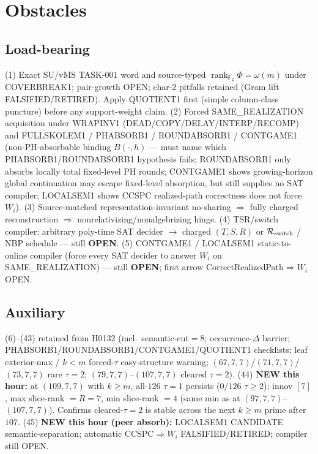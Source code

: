 \documentclass[11pt]{article}
\begin{document}
\section*{Obstacles}
\subsection*{Load-bearing}
(1) Exact SU/vMS TASK-001 word and source-typed
$\operatorname{rank}_{\mathbb F_2}\Phi=\omega(m)$ under COVERBREAK1; pair-growth OPEN;
char-$2$ pitfalls retained (Gram lift FALSIFIED/RETIRED). Apply QUOTIENT1 first
(simple column-class puncture) before any support-weight claim.
(2) Forced SAME\_REALIZATION acquisition under WRAPINV1
(DEAD/COPY/DELAY/INTERP/RECOMP) and FULLSKOLEM1 / PHABSORB1 / ROUNDABSORB1 / CONTGAME1
(non-PH-absorbable binding $B(\cdot,h)$ --- must name which PHABSORB1/ROUNDABSORB1
hypothesis fails; ROUNDABSORB1 only absorbs locally total fixed-level PH rounds;
CONTGAME1 shows growing-horizon global continuation may escape fixed-level absorption,
but still supplies no SAT compiler; LOCALSEM1 shows CCSPC realized-path correctness
does not force $W_i$).
(3) Source-matched representation-invariant no-sharing $\Rightarrow$ fully charged reconstruction
$\Rightarrow$ nonrelativizing/nonalgebrizing hinge.
(4) TSR/switch compiler: arbitrary poly-time SAT decider $\to$ charged $(T,S,R)$ or
$\mathcal R_{\rm switch}$ / NBP schedule --- still \textbf{OPEN}.
(5) CONTGAME1 / LOCALSEM1 static-to-online compiler (force every SAT decider to answer $W_i$ on
SAME\_REALIZATION) --- still \textbf{OPEN}; first arrow CorrectRealizedPath$\Rightarrow W_i$ OPEN.

\subsection*{Auxiliary}
(6)--(43) retained from H0132 (incl.\ semantic-cut$=8$; occurrence-$\Delta$ barrier;
PHABSORB1/ROUNDABSORB1/CONTGAME1/QUOTIENT1 checklists; leaf exterior-max / $k{<}m$ forced-$\tau$ easy-structure warning;
$(67,7,7)$/$(71,7,7)$/$(73,7,7)$ rare $\tau{=}2$; $(79,7,7)$--$(107,7,7)$ cleared $\tau{=}2$).
(44) \textbf{NEW this hour:} at $(109,7,7)$ with $k{\ge}m$, all-$126$ $\tau{=}1$ persists
($0/126$ $\tau{\ge}2$); innov $[7]$, max slice-rank $=R{=}7$, min slice-rank $=4$
(same min as at $(97,7,7)$--$(107,7,7)$). Confirms cleared-$\tau{=}2$
is stable across the next $k{\ge}m$ prime after $107$.
(45) \textbf{NEW this hour (peer absorb):} LOCALSEM1 CANDIDATE semantic-separation;
automatic CCSPC$\Rightarrow W_i$ FALSIFIED/RETIRED; compiler still OPEN.
\end{document}
